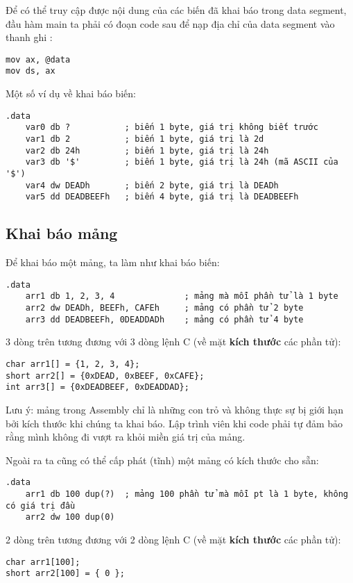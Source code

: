 \documentclass[main.tex]{subfiles}
\begin{document}
Để có thể truy cập được nội dung của các biến đã khai báo trong data segment, đầu hàm main ta phải có đoạn code sau để nạp địa chỉ của data segment vào thanh ghi :
\begin{verbatim}
mov ax, @data 
mov ds, ax
\end{verbatim}

Một số ví dụ về khai báo biến:
\begin{verbatim}
.data 
    var0 db ?           ; biến 1 byte, giá trị không biết trước
    var1 db 2           ; biến 1 byte, giá trị là 2d
    var2 db 24h         ; biến 1 byte, giá trị là 24h
    var3 db '$'         ; biến 1 byte, giá trị là 24h (mã ASCII của '$')
    var4 dw DEADh       ; biến 2 byte, giá trị là DEADh
    var5 dd DEADBEEFh   ; biến 4 byte, giá trị là DEADBEEFh
\end{verbatim}

\subsection{Khai báo mảng}
Để khai báo một mảng, ta làm như khai báo biến:
\begin{verbatim}
.data
    arr1 db 1, 2, 3, 4              ; mảng mà mỗi phần tử là 1 byte
    arr2 dw DEADh, BEEFh, CAFEh     ; mảng có phần tử 2 byte
    arr3 dd DEADBEEFh, 0DEADDADh    ; mảng có phần tử 4 byte
\end{verbatim}
3 dòng trên tương đương với 3 dòng lệnh C (về mặt \textbf{kích thước} các phần tử):
\begin{verbatim}
char arr1[] = {1, 2, 3, 4};
short arr2[] = {0xDEAD, 0xBEEF, 0xCAFE};
int arr3[] = {0xDEADBEEF, 0xDEADDAD};
\end{verbatim}

Lưu ý: mảng trong Assembly chỉ là những con trỏ và không thực sự bị giới hạn bởi kích thước khi chúng ta khai báo. Lập trình viên khi code phải tự đảm bảo rằng mình không đi vượt ra khỏi miền giá trị của mảng.

Ngoài ra ta cũng có thể cấp phát (tĩnh) một mảng có kích thước cho sẵn:
\begin{verbatim}
.data
    arr1 db 100 dup(?)  ; mảng 100 phần tử mà mỗi pt là 1 byte, không có giá trị đầu
    arr2 dw 100 dup(0)
\end{verbatim}
2 dòng trên tương đương với 2 dòng lệnh C (về mặt \textbf{kích thước} các phần tử):
\begin{verbatim}
char arr1[100];
short arr2[100] = { 0 }; 
\end{verbatim}
\end{document}
